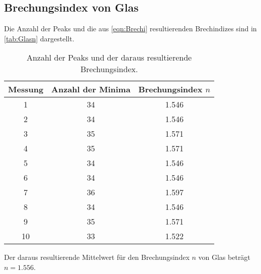 \subsection{Brechungsindex von Glas}
\label{sec:AuswGlas}
Die Anzahl der Peaks und die aus \autoref{eqn:Brechi} resultierenden Brechindizes sind in \autoref{tab:Glasn} dargestellt.
\begin{table}
    \centering
    \caption{Anzahl der Peaks und der daraus resultierende Brechungsindex.}
    \begin{tabular}{c c c}
        \toprule
        Messung & Anzahl der Minima & Brechungsindex $n$ \\
        \midrule
             1 & 34 & 1.546\\
             2 & 34 & 1.546\\
             3 & 35 & 1.571\\
             4 & 35 & 1.571\\
             5 & 34 & 1.546\\
             6 & 34 & 1.546\\
             7 & 36 & 1.597\\
             8 & 34 & 1.546\\
             9 & 35 & 1.571\\
            10 & 33 & 1.522\\
            \bottomrule
    \end{tabular}
    \label{tab:Glasn}
\end{table}
Der daraus resultierende Mittelwert für den Brechungsindex $n$ von Glas beträgt $n=1.556$.


